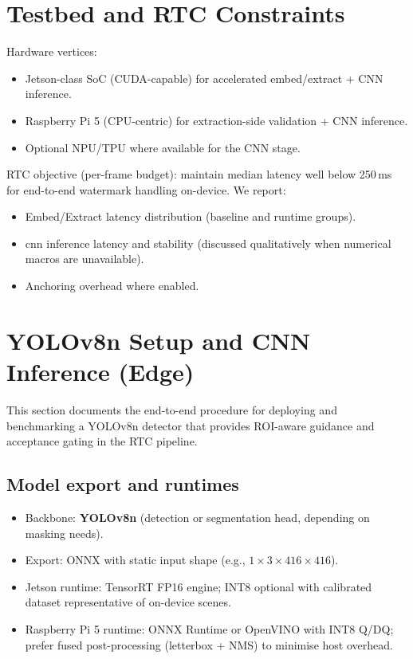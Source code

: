 \section{Testbed and RTC Constraints}
\label{sec:validation:testbed}

Hardware vertices:
\begin{itemize}
    \item Jetson-class SoC (CUDA-capable) for accelerated embed/extract + CNN inference.
    \item Raspberry Pi 5 (CPU-centric) for extraction-side validation + CNN inference.
    \item Optional NPU/TPU where available for the CNN stage.
\end{itemize}

RTC objective (per-frame budget): maintain median latency well below 250\,ms for end-to-end watermark handling on-device. We report:
\begin{itemize}
    \item Embed/Extract latency distribution (baseline and runtime groups).
    \item \gls{cnn} inference latency and stability (discussed qualitatively when numerical macros are unavailable).
    \item Anchoring overhead where enabled.
\end{itemize}

\section{YOLOv8n Setup and CNN Inference (Edge)}
\label{sec:validation:yolov8n-setup}

This section documents the end-to-end procedure for deploying and benchmarking a YOLOv8n detector that provides ROI-aware guidance and acceptance gating in the RTC pipeline.

\subsection{Model export and runtimes}
\label{sec:validation:yolov8n-export}
\begin{itemize}
  \item Backbone: \textbf{YOLOv8n} (detection or segmentation head, depending on masking needs).
  \item Export: ONNX with static input shape (e.g., \(1\times3\times416\times416\)).
  \item Jetson runtime: TensorRT FP16 engine; INT8 optional with calibrated dataset representative of on-device scenes.
  \item Raspberry Pi 5 runtime: ONNX Runtime or OpenVINO with INT8 Q/DQ; prefer fused post-processing (letterbox + NMS) to minimise host overhead.
\end{itemize}

